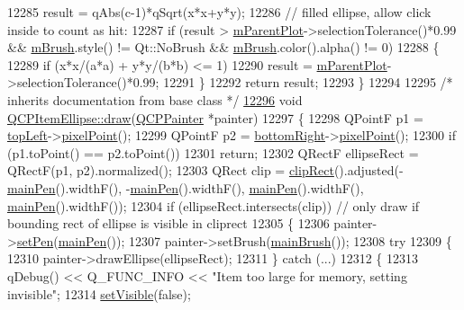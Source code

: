 \begin{DoxyCode}
12285   result = qAbs(c-1)*qSqrt(x*x+y*y);
12286   \textcolor{comment}{// filled ellipse, allow click inside to count as hit:}
12287   \textcolor{keywordflow}{if} (result > \hyperlink{a00044_aa2a528433e44db02b8aef23c1f9f90ed}{mParentPlot}->selectionTolerance()*0.99 && \hyperlink{a00035_a6fa59478cd3ad1b10e6c1f6cedc84bd6}{mBrush}.style() != Qt::NoBrush && 
      \hyperlink{a00035_a6fa59478cd3ad1b10e6c1f6cedc84bd6}{mBrush}.color().alpha() != 0)
12288   \{
12289     \textcolor{keywordflow}{if} (x*x/(a*a) + y*y/(b*b) <= 1)
12290       result = \hyperlink{a00044_aa2a528433e44db02b8aef23c1f9f90ed}{mParentPlot}->selectionTolerance()*0.99;
12291   \}
12292   \textcolor{keywordflow}{return} result;
12293 \}
12294 
12295 \textcolor{comment}{/* inherits documentation from base class */}
\hypertarget{a00115_source_l12296}{}\hyperlink{a00035_afe97ec827adb05f000fe007783faae3c}{12296} \textcolor{keywordtype}{void} \hyperlink{a00035_afe97ec827adb05f000fe007783faae3c}{QCPItemEllipse::draw}(\hyperlink{a00047}{QCPPainter} *painter)
12297 \{
12298   QPointF p1 = \hyperlink{a00035_a12fd8420c06718d0c8a2303d6a652848}{topLeft}->\hyperlink{a00038_ae490f9c76ee2ba33752c495d3b6e8fb5}{pixelPoint}();
12299   QPointF p2 = \hyperlink{a00035_ab73c8deafc0d8d1ef7d75b6cdcc37159}{bottomRight}->\hyperlink{a00038_ae490f9c76ee2ba33752c495d3b6e8fb5}{pixelPoint}();
12300   \textcolor{keywordflow}{if} (p1.toPoint() == p2.toPoint())
12301     \textcolor{keywordflow}{return};
12302   QRectF ellipseRect = QRectF(p1, p2).normalized();
12303   QRect clip = \hyperlink{a00022_a538e25ff8856534582f5b2b400a46405}{clipRect}().adjusted(-\hyperlink{a00035_afc78d49ed5ffa886bccf18f297f83d30}{mainPen}().widthF(), -\hyperlink{a00035_afc78d49ed5ffa886bccf18f297f83d30}{mainPen}().widthF(), 
      \hyperlink{a00035_afc78d49ed5ffa886bccf18f297f83d30}{mainPen}().widthF(), \hyperlink{a00035_afc78d49ed5ffa886bccf18f297f83d30}{mainPen}().widthF());
12304   \textcolor{keywordflow}{if} (ellipseRect.intersects(clip)) \textcolor{comment}{// only draw if bounding rect of ellipse is visible in cliprect}
12305   \{
12306     painter->\hyperlink{a00047_af9c7a4cd1791403901f8c5b82a150195}{setPen}(\hyperlink{a00035_afc78d49ed5ffa886bccf18f297f83d30}{mainPen}());
12307     painter->setBrush(\hyperlink{a00035_a2a9757204877c9d0fd07adfb26d6b1d8}{mainBrush}());
12308     \textcolor{keywordflow}{try}
12309     \{
12310       painter->drawEllipse(ellipseRect);
12311     \} \textcolor{keywordflow}{catch} (...)
12312     \{
12313       qDebug() << Q\_FUNC\_INFO << \textcolor{stringliteral}{"Item too large for memory, setting invisible"};
12314       \hyperlink{a00044_a3bed99ddc396b48ce3ebfdc0418744f8}{setVisible}(\textcolor{keyword}{false});

\end{DoxyCode}
